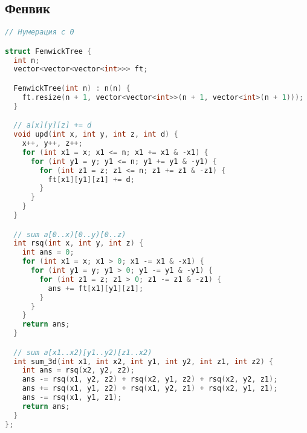\documentclass[10pt,a4paper,landscape,twosided]{extarticle}
\begin{document}
\begin{multicols*}{3}
\subsection{Фенвик}
\begin{lstlisting}[language=C++]
// Нумерация с 0

struct FenwickTree {
  int n;
  vector<vector<vector<int>>> ft;

  FenwickTree(int n) : n(n) {
    ft.resize(n + 1, vector<vector<int>>(n + 1, vector<int>(n + 1)));
  }

  // a[x][y][z] += d
  void upd(int x, int y, int z, int d) {
    x++, y++, z++;
    for (int x1 = x; x1 <= n; x1 += x1 & -x1) {
      for (int y1 = y; y1 <= n; y1 += y1 & -y1) {
        for (int z1 = z; z1 <= n; z1 += z1 & -z1) {
          ft[x1][y1][z1] += d;
        }
      }
    }
  }

  // sum a[0..x)[0..y)[0..z)
  int rsq(int x, int y, int z) {
    int ans = 0;
    for (int x1 = x; x1 > 0; x1 -= x1 & -x1) {
      for (int y1 = y; y1 > 0; y1 -= y1 & -y1) {
        for (int z1 = z; z1 > 0; z1 -= z1 & -z1) {
          ans += ft[x1][y1][z1];
        }
      }
    }
    return ans;
  }

  // sum a[x1..x2)[y1..y2)[z1..x2)
  int sum_3d(int x1, int x2, int y1, int y2, int z1, int z2) {
    int ans = rsq(x2, y2, z2);
    ans -= rsq(x1, y2, z2) + rsq(x2, y1, z2) + rsq(x2, y2, z1);
    ans += rsq(x1, y1, z2) + rsq(x1, y2, z1) + rsq(x2, y1, z1);
    ans -= rsq(x1, y1, z1);
    return ans;
  }
};
\end{lstlisting}


\end{multicols*}
\end{document}
